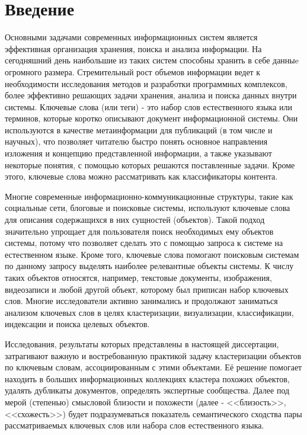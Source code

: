\chapter*{Введение}							%
\nocite{*}
Основными задачами современных информационных систем является эффективная организация хранения, поиска и анализа информации.
На сегодняшний день наибольшие из таких систем способны хранить в себе данныe огромного размера. Стремительный рост объемов информации ведет к необходимости исследования методов и разработки программных комплексов, более эффективно решающих задачи хранения, анализа и поиска данных внутри системы. 
Ключевые слова (или теги) - это набор слов естественного языка или терминов, которые коротко описывают документ информационной системы. Они используются в качестве метаинформации для публикаций (в том числе и научных), что позволяет читателю быстро понять основное направления изложения и концепцию представленной информации, а также указывают некоторые понятия, с помощью которых решаются поставленные задачи. Кроме этого, ключевые слова можно рассматривать как классификаторы контента.

Многие современные информационно-коммуникационные структуры, такие как социальные сети, блоговые и поисковые системы, используют ключевые слова для описания содержащихся в них сущностей (объектов). Такой подход значительно упрощает для пользователя поиск необходимых ему объектов системы, потому что позволяет сделать это с помощью запроса к системе на естественном языке.  Кроме того, ключевые слова помогают поисковым системам по данному запросу выделять наиболее релевантные объекты системы. К числу таких объектов относятся, например, текстовые документы, изображения, видеозаписи и любой другой объект, которому был приписан набор ключевых слов. Многие исследователи активно занимались и продолжают заниматься анализом ключевых слов в целях кластеризации, визуализации, классификации, индексации и поиска целевых объектов.

Исследования, результаты которых представлены в настоящей диссертации, затрагивают важную и востребованную практикой задачу кластеризации объектов по ключевым словам, ассоциированным с этими объектами. Её решение помогает находить в больших информационных коллекциях кластера похожих объектов, удалять дубликаты документов, определять экспертные сообщества. Далее под мерой (степенью) смысловой близости и похожести (далее - <<близость>>, <<схожесть>>) будет подразумеваться показатель семантического сходства пары рассматриваемых ключевых слов или набора слов естественного языка.




